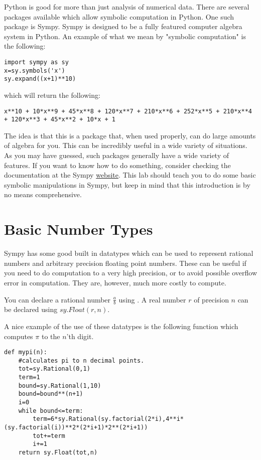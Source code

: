 \label{lab:Sympy}


Python is good for more than just analysis of numerical data.
There are several packages available which allow symbolic computation in Python.
One such package is Sympy.
Sympy is designed to be a fully featured computer algebra system in Python.
An example of what we mean by "symbolic computation" is the following:
\begin{lstlisting}
import sympy as sy
x=sy.symbols('x')
sy.expand((x+1)**10)
\end{lstlisting}
which will return the following:
\begin{lstlisting}
x**10 + 10*x**9 + 45*x**8 + 120*x**7 + 210*x**6 + 252*x**5 + 210*x**4 + 120*x**3 + 45*x**2 + 10*x + 1
\end{lstlisting}
The idea is that this is a package that, when used properly, can do large amounts of algebra for you.
This can be incredibly useful in a wide variety of situations.
As you may have guessed, such packages generally have a wide variety of features. 
If you want to know how to do something, consider checking the documentation  at the Sympy \href{http://sympy.org/en/index.htmll}{website}.
This lab should teach you to do some basic symbolic manipulations in Sympy, but keep in mind that this introduction is by no means comprehensive.

\section*{Basic Number Types}
Sympy has some good built in datatypes which can be used to represent rational numbers and arbitrary precision floating point numbers.
These can be useful if you need to do computation to a very high precision, or to avoid possible overflow error in computation.
They are, however, much more costly to compute.

You can declare a rational number $\frac{a}{b}$ using .
A real number $r$ of precision $n$ can be declared using $sy.Float(r,n)$.

A nice example of the use of these datatypes is the following function which computes $\pi$ to the $n$'th digit.
\begin{lstlisting}
def mypi(n):
    #calculates pi to n decimal points.
    tot=sy.Rational(0,1)
    term=1
    bound=sy.Rational(1,10)
    bound=bound**(n+1)
    i=0
    while bound<=term:
        term=6*sy.Rational(sy.factorial(2*i),4**i*(sy.factorial(i))**2*(2*i+1)*2**(2*i+1))
        tot+=term
        i+=1
    return sy.Float(tot,n)
\end{lstlisting}

